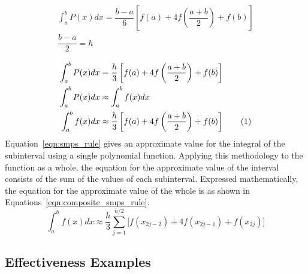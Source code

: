 \documentclass{paper}
\newcommand*\tageq{\refstepcounter{equation}\tag{\theequation}}
\begin{document}
% 
\begin{gather*}
\int_a^b P(x) dx = \dfrac{b - a}{6} \left[f(a) + 4f\left(\dfrac{a + b}{2}\right) + f(b)\right]                          \\
\dfrac{b - a}{2} = h                                                                                                    \\
\end{gather*}
\begin{align*}
    \int_a^b P(x) dx &= \dfrac{h}{3} \left[f(a) + 4f\left(\dfrac{a + b}{2}\right) + f(b)\right]                         \\
    \int_a^b P(x) dx &\approx \int_a^b f(x) dx                                                                          \\
    \int_a^b f(x) dx &\approx \dfrac{h}{3} \left[f(a) + 4f\left(\dfrac{a + b}{2}\right) + f(b)\right]  \tageq\label{eqn:smps_rule}
\end{align*}
% 
Equation~\ref{eqn:smps_rule} gives an approximate value for the integral of the subinterval using a single polynomial function.
Applying this methodology to the function as a whole, the equation for the approximate value of the interval consists of the sum of the values of each subinterval.
Expressed mathematically, the equation for the approximate value of the whole is as shown in Equations~\ref{eqn:composite_smps_rule}.
% 
\begin{equation}
    \label{eqn:composite_smps_rule}
    \int_a^b f(x) dx \approx \dfrac{h}{3} \sum_{j=1}^{n / 2} \biggl[f(x_{2j-2}) + 4f(x_{2j-1}) + f(x_{2j})\biggr]
\end{equation}
% 
% 
%
\subsection{Effectiveness Examples}
\end{document}
